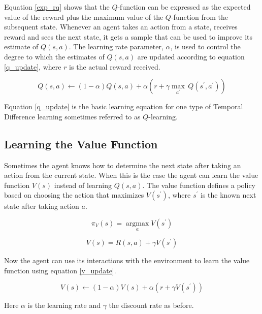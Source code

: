 Equation \eqref{exp_rq} shows that the  $Q$-function can be expressed as the expected value of the reward plus the maximum value of the $Q$-function from the subsequent state.  Whenever an agent takes an action from a state, receives reward and sees the next state, it gets a sample that can be used to improve its estimate of $Q(s,a)$.  The learning rate parameter, $\alpha$, is used to control the degree to which the estimates of $Q(s,a)$ are updated according to equation \eqref{q_update}, where $r$ is the actual reward received.

\begin{equation}
Q(s,a)\gets (1-\alpha)Q(s,a)+\alpha \left(r + \gamma {\operatorname*{max}_{a^\prime}}\,Q(s^\prime, a^\prime)\right) \label{q_update}
\end{equation}

Equation \eqref{q_update} is the basic learning equation for one type of Temporal Difference learning sometimes referred to as  $Q$-learning.

\subsection{Learning the Value Function}
Sometimes the agent knows how to determine the next state after taking an action from the current state.  When this is the case the agent can learn the value function $V(s)$ instead of learning $Q(s,a)$.  The value function defines a policy based on choosing the action that maximizes $V(s^\prime)$, where $s^\prime$ is the known next state after taking action $a$.

\begin{equation}
\pi_V(s)={\operatorname*{argmax}_a}V(s^\prime) \label{policy_v}
\end{equation}

\begin{equation}
V(s)=R(s,a)+\gamma V(s^\prime) \label{v_def}
\end{equation}

Now the agent can use its interactions with the environment to learn the value function using equation \eqref{v_update}.

\begin{equation}
V(s) \gets (1-\alpha )V(s)+\alpha \left(r+\gamma V(s^\prime)\right) \label{v_update}
\end{equation}

Here $\alpha$ is the learning rate and $\gamma$ the discount rate as before.

